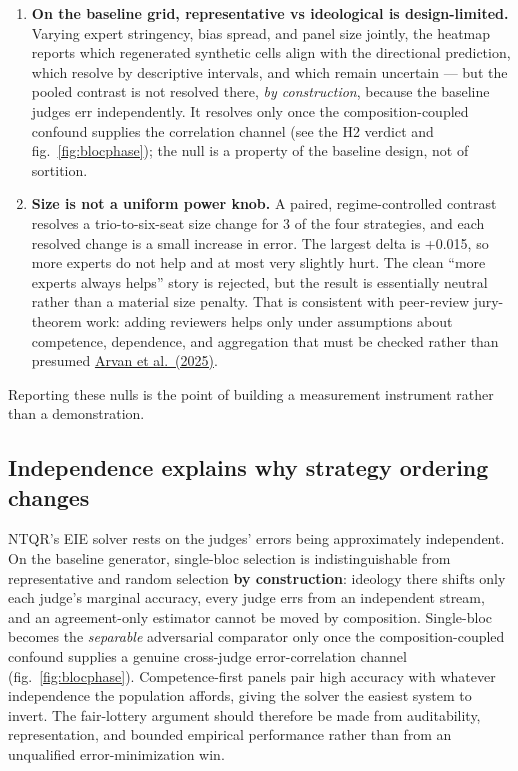 \documentclass[
]{article}
\begin{document}
\begin{enumerate}
\def\labelenumi{\arabic{enumi}.}
\item
  \textbf{On the baseline grid, representative vs ideological is
  design-limited.} Varying expert stringency, bias spread, and panel
  size jointly, the heatmap reports which regenerated synthetic cells
  align with the directional prediction, which resolve by descriptive
  intervals, and which remain uncertain --- but the pooled contrast is
  not resolved there, \emph{by construction}, because the baseline
  judges err independently. It resolves only once the
  composition-coupled confound supplies the correlation channel (see the
  H2 verdict and fig.~\ref{fig:blocphase}); the null is a property of
  the baseline design, not of sortition.
\item
  \textbf{Size is not a uniform power knob.} A paired, regime-controlled
  contrast resolves a trio-to-six-seat size change for 3 of the four
  strategies, and each resolved change is a small increase in error. The
  largest delta is +0.015, so more experts do not help and at most very
  slightly hurt. The clean ``more experts always helps'' story is
  rejected, but the result is essentially neutral rather than a material
  size penalty. That is consistent with peer-review jury-theorem work:
  adding reviewers helps only under assumptions about competence,
  dependence, and aggregation that must be checked rather than presumed
  \href{https://doi.org/10.1086/719117}{Arvan et al.~(2025)}.
\end{enumerate}

Reporting these nulls is the point of building a measurement instrument
rather than a demonstration.

\subsection{Independence explains why strategy ordering
changes}\label{independence-explains-why-strategy-ordering-changes}

NTQR's EIE solver rests on the judges' errors being approximately
independent. On the baseline generator, single-bloc selection is
indistinguishable from representative and random selection \textbf{by
construction}: ideology there shifts only each judge's marginal
accuracy, every judge errs from an independent stream, and an
agreement-only estimator cannot be moved by composition. Single-bloc
becomes the \emph{separable} adversarial comparator only once the
composition-coupled confound supplies a genuine cross-judge
error-correlation channel (fig.~\ref{fig:blocphase}). Competence-first
panels pair high accuracy with whatever independence the population
affords, giving the solver the easiest system to invert. The
fair-lottery argument should therefore be made from auditability,
representation, and bounded empirical performance rather than from an
unqualified error-minimization win.
\end{document}

